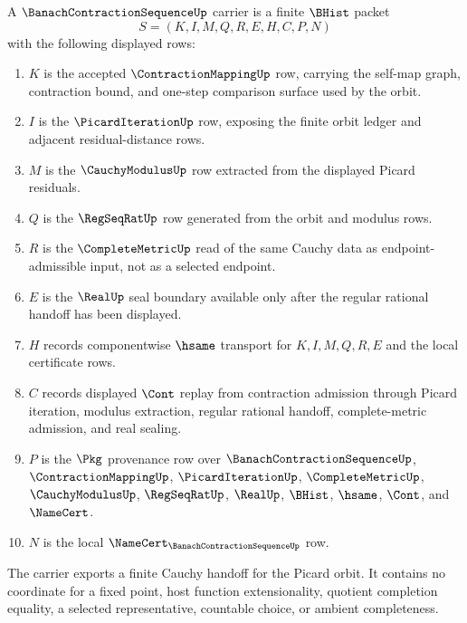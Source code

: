 \begin{definition}
\label{def:banach-contraction-sequence-carrier}
A $\BanachContractionSequenceUp$ carrier is a finite $\BHist$ packet
$$
S=(K,I,M,Q,R,E,H,C,P,N)
$$
with the following displayed rows:
\begin{enumerate}
\item $K$ is the accepted $\ContractionMappingUp$ row, carrying the self-map graph, contraction bound, and one-step comparison surface used by the orbit.
\item $I$ is the $\PicardIterationUp$ row, exposing the finite orbit ledger and adjacent residual-distance rows.
\item $M$ is the $\CauchyModulusUp$ row extracted from the displayed Picard residuals.
\item $Q$ is the $\RegSeqRatUp$ row generated from the orbit and modulus rows.
\item $R$ is the $\CompleteMetricUp$ read of the same Cauchy data as endpoint-admissible input, not as a selected endpoint.
\item $E$ is the $\RealUp$ seal boundary available only after the regular rational handoff has been displayed.
\item $H$ records componentwise $\hsame$ transport for $K,I,M,Q,R,E$ and the local certificate rows.
\item $C$ records displayed $\Cont$ replay from contraction admission through Picard iteration, modulus extraction, regular rational handoff, complete-metric admission, and real sealing.
\item $P$ is the $\Pkg$ provenance row over $\BanachContractionSequenceUp$, $\ContractionMappingUp$, $\PicardIterationUp$, $\CompleteMetricUp$, $\CauchyModulusUp$, $\RegSeqRatUp$, $\RealUp$, $\BHist$, $\hsame$, $\Cont$, and $\NameCert$.
\item $N$ is the local $\NameCert_{\BanachContractionSequenceUp}$ row.
\end{enumerate}
The carrier exports a finite Cauchy handoff for the Picard orbit. It contains no coordinate for a fixed point, host function extensionality, quotient completion equality, a selected representative, countable choice, or ambient completeness.
\end{definition}

